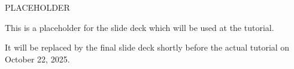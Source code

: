 \begin{frame}[fragile]

\begin{center}

  \vstrut{0em}{10ex}

  {\LARGE PLACEHOLDER}

  \vspace*{10ex}

  \begin{minipage}{0.7\textwidth}
    This is a placeholder for the slide deck which will be used at the tutorial.

  \vspace*{5ex}

    It will be replaced by the final slide deck shortly before the
    actual tutorial on October 22, 2025.
  \end{minipage}

\end{center}

\end{frame}


